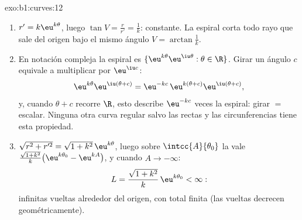 \begin{solution}{exo:b1:curves:12}
\begin{enumerate}
  \item $r' = k\eu^{k\theta}$, luego $\tan V = \frac{r}{r'} =
        \frac1k$: constante. La espiral corta todo rayo que sale del
        origen bajo el mismo ángulo $V = \arctan\frac1k$.
  \item En notación compleja la espiral es $\{\eu^{k\theta}
        \eu^{\iu\theta} : \theta \in \R\}$. Girar un ángulo $c$
        equivale a multiplicar por $\eu^{\iu c}$:
        \[
        \eu^{k\theta}\eu^{\iu(\theta + c)}
        = \eu^{-kc}\,\eu^{k(\theta + c)}\eu^{\iu(\theta+c)} ,
        \]
        y, cuando $\theta + c$ recorre $\R$, esto describe
        $\eu^{-kc}$ veces la espiral: girar $=$ escalar. Ninguna
        otra curva regular salvo las rectas y las
        circunferencias tiene esta propiedad.
  \item $\sqrt{r^2 + r'^2} = \sqrt{1 + k^2}\,\eu^{k\theta}$, luego
        sobre $\intcc{A}{\theta_0}$ la  vale
        $\frac{\sqrt{1+k^2}}{k}\bigl(\eu^{k\theta_0} -
        \eu^{kA}\bigr)$, y cuando $A \to -\infty$:
        \[
        L = \frac{\sqrt{1 + k^2}}{k}\,\eu^{k\theta_0} < \infty :
        \]
        infinitas vueltas alrededor del origen, con 
        total finita (las vueltas decrecen geométricamente).
\end{enumerate}
\end{solution}

